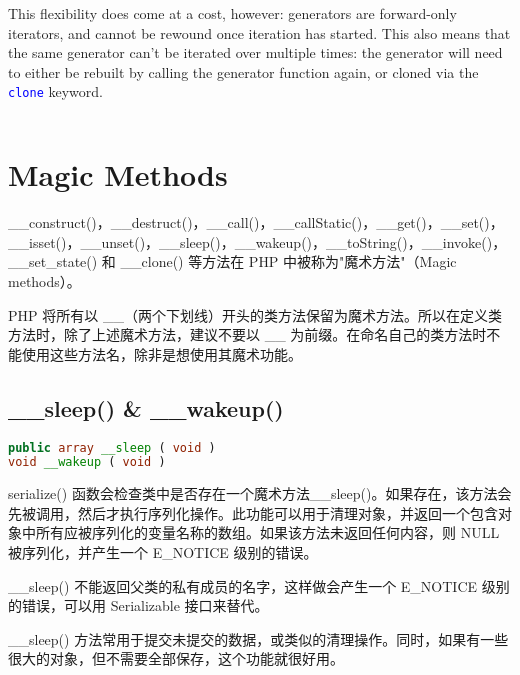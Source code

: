 This flexibility does come at a cost, however: generators are forward-only iterators, and cannot be rewound once iteration has started. This also means that the same generator can't be iterated over multiple times: the generator will need to either be rebuilt by calling the generator function again, or cloned via the \textcolor{Blue}{\texttt{clone}} keyword.


\begin{example}

\begin{lstlisting}[language=PHP]

\end{lstlisting}
\end{example}





\chapter{Magic Methods}


\_\_construct()，\_\_destruct()，\_\_call()，\_\_callStatic()，\_\_get()，\_\_set()，\_\_isset()，\_\_unset()，\_\_sleep()，\_\_wakeup()，\_\_toString()，\_\_invoke()，\_\_set\_state() 和 \_\_clone() 等方法在 PHP 中被称为"魔术方法"（Magic methods）。

PHP 将所有以 \_\_（两个下划线）开头的类方法保留为魔术方法。所以在定义类方法时，除了上述魔术方法，建议不要以 \_\_ 为前缀。在命名自己的类方法时不能使用这些方法名，除非是想使用其魔术功能。


\section{\_\_sleep() \& \_\_wakeup()}


\begin{lstlisting}[language=PHP]
public array __sleep ( void )
void __wakeup ( void )
\end{lstlisting}

serialize() 函数会检查类中是否存在一个魔术方法\_\_sleep()。如果存在，该方法会先被调用，然后才执行序列化操作。此功能可以用于清理对象，并返回一个包含对象中所有应被序列化的变量名称的数组。如果该方法未返回任何内容，则 NULL 被序列化，并产生一个 E\_NOTICE 级别的错误。

\_\_sleep() 不能返回父类的私有成员的名字，这样做会产生一个 E\_NOTICE 级别的错误，可以用 Serializable 接口来替代。

\_\_sleep() 方法常用于提交未提交的数据，或类似的清理操作。同时，如果有一些很大的对象，但不需要全部保存，这个功能就很好用。

